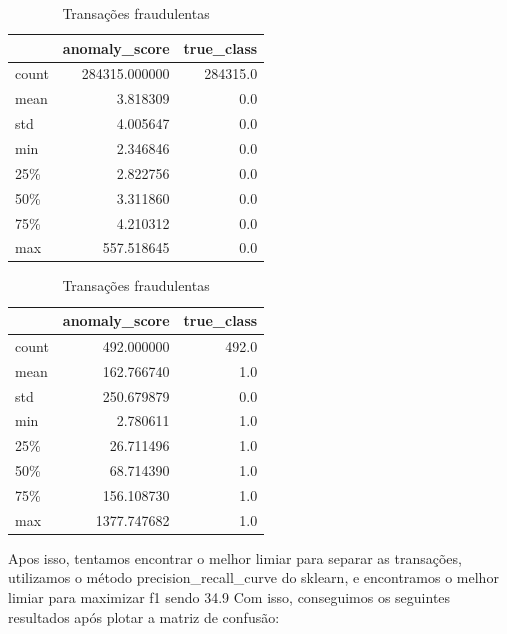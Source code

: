\documentclass[conference]{IEEEtran}
\begin{document}
\begin{table}[H]
    \centering
  \begin{minipage}{0.48\textwidth}
      \centering
      \begin{tabular}{lrr}
          \toprule
          & \textbf{anomaly\_score} & \textbf{true\_class} \\
          \midrule
          count & 284315.000000 & 284315.0 \\
          mean & 3.818309 & 0.0 \\
          std & 4.005647 & 0.0 \\
          min & 2.346846 & 0.0 \\
          25\% & 2.822756 & 0.0 \\
          50\% & 3.311860 & 0.0 \\
          75\% & 4.210312 & 0.0 \\
          max & 557.518645 & 0.0 \\
          \bottomrule
      \end{tabular}
      \caption{Transações normais}
      \label{tab:score_anomalia_normal}
  \end{minipage}\hfill
  \begin{minipage}{0.48\textwidth}
      \centering
      \begin{tabular}{lrr}
          \toprule
          & \textbf{anomaly\_score} & \textbf{true\_class} \\
          \midrule
          count & 492.000000 & 492.0 \\
          mean & 162.766740 & 1.0 \\
          std & 250.679879 & 0.0 \\
          min & 2.780611 & 1.0 \\
          25\% & 26.711496 & 1.0 \\
          50\% & 68.714390 & 1.0 \\
          75\% & 156.108730 & 1.0 \\
          max & 1377.747682 & 1.0 \\
          \bottomrule
      \end{tabular}
      \caption{Transações fraudulentas}
      \label{tab:score_anomalia_fraude}
  \end{minipage}
\end{table}
Apos isso, tentamos encontrar o melhor limiar para separar as transações, utilizamos o método precision\_recall\_curve do sklearn, e encontramos o melhor limiar para maximizar f1 sendo 34.9 Com isso, conseguimos os seguintes resultados após plotar a matriz de confusão:
\end{document}
